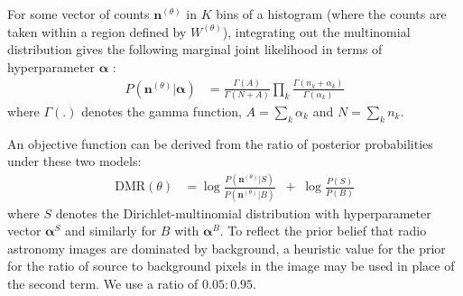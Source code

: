 \documentclass[
    ,final            %
  ]
  {aipproc}
\begin{document}


For some vector of counts $\textbf{n}^{(\theta)}$ in $K$ bins of a histogram (where the counts are taken within a region defined by $W^{(\theta)}$), integrating out the multinomial distribution gives the following marginal joint likelihood in terms of hyperparameter $\boldsymbol{\alpha}$ \cite{ng2011dirichlet}:
\begin{align}
P(\textbf{n}^{(\theta)}|\boldsymbol{\alpha}) &= \frac{\Gamma(A)}{\Gamma(N+A)} \prod_k \frac{\Gamma(n_k+\alpha_k)}{\Gamma(\alpha_k)}  \label{eq:muldir} 
\end{align}
where $\Gamma(.)$ denotes the gamma function, $A = \sum_k \alpha_k$ and $N = \sum_k n_k$. 


An objective  function can be derived from the ratio of posterior probabilities \cite{kass1995bayes} under these two models:
\begin{align}
\text{DMR}(\theta) 
&= \log \frac{P(\textbf{n}^{(\theta)} | S)}{P(\textbf{n}^{(\theta)} | B)} \;\; + \; \log \frac{P(S)}{P(B)}\label{eq:score2}
\end{align}
where $S$ denotes the Dirichlet-multinomial distribution with hyperparameter vector $\boldsymbol{\alpha}^S$ and similarly for $B$ with $\boldsymbol{\alpha}^B$.
To reflect the prior belief that radio astronomy images are dominated
by background, a heuristic value for the prior for the ratio of source
to background pixels in the image may be used in place of the second
term. We use a ratio of $0.05 : 0.95$.
\end{document}

